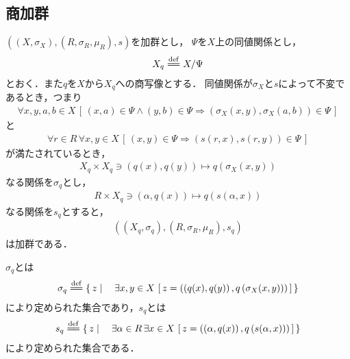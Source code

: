 \subsection{商加群}
	\begin{screen}
		\begin{thm}[商加群]\label{thm:quotient_module}
			$\left(\left(X,\sigma_X\right),\left(R,\sigma_R,\mu_R\right),s\right)$を加群とし，
			$\Psi$を$X$上の同値関係とし，
			\begin{align}
				X_q \defeq X/\Psi
			\end{align}
			とおく．また$q$を$X$から$X_q$への商写像とする．
			同値関係が$\sigma_X$と$s$によって不変であるとき，つまり
			\begin{align}
				\forall x,y,a,b \in X\,
				\left[\, (x,a) \in \Psi \wedge (y,b) \in \Psi \Longrightarrow 
				\left(\sigma_X(x,y), \sigma_X(a,b)\right) \in \Psi\, \right]
				\label{fom:thm_quotient_module_1}
			\end{align}
			と
			\begin{align}
				\forall r \in R\, \forall x,y \in X\,
				\left[\, (x,y) \in \Psi \Longrightarrow 
				\left(s(r,x), s(r,y)\right) \in \Psi\, \right]
				\label{fom:thm_quotient_module_2}
			\end{align}
			が満たされているとき，
			\begin{align}
				X_q \times X_q \ni \left(q(x),q(y)\right) \longmapsto q\left(\sigma_X(x,y)\right)
			\end{align}
			なる関係を$\sigma_q$とし，
			\begin{align}
				R \times X_q \ni \left(\alpha,q(x)\right) \longmapsto q\left(s(\alpha,x)\right)
			\end{align}
			なる関係を$s_q$とすると，
			\begin{align}
				\left(\left(X_q,\sigma_q\right),\left(R,\sigma_R,\mu_R\right),s_q\right)
			\end{align}
			は加群である．
		\end{thm}
	\end{screen}
	
	$\sigma_q$とは
	\begin{align}
		\sigma_q \defeq \Set{z}{\exists x,y \in X\, 
		\left[\, z=\left(\left(q(x),q(y)\right),q\left(\sigma_X(x,y)\right)\right)\, \right]}
	\end{align}
	により定められた集合であり，$s_q$とは
	\begin{align}
		s_q \defeq \Set{z}{\exists \alpha \in R\, \exists x \in X\, 
		\left[\, z=\left(\left(\alpha,q(x)\right),q\left(s(\alpha,x)\right)\right)\, \right]}
	\end{align}
	により定められた集合である．
	
